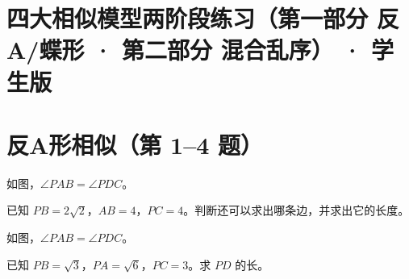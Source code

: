 \documentclass{exam-zh}
\begin{document}
\section*{四大相似模型两阶段练习（第一部分 反A/蝶形 · 第二部分 混合乱序） · 学生版}

\section*{反A形相似（第 1–4 题）}


\begin{problem}[points=10]
  \noindent
  \begin{minipage}[t]{\dimexpr\linewidth-60mm-6mm\relax}
    \vspace{0pt}
    如图，$\angle PAB=\angle PDC$。

已知 $PB=2\sqrt{2}$，$AB=4$，$PC=4$。判断还可以求出哪条边，并求出它的长度。
    
  \end{minipage}\hfill
  \begin{diagramcoltikz}{60mm}{}
  }
  \end{diagramcoltikz}
  \par\medskip
  \answerarea[54mm]
\end{problem}



\begin{problem}[points=10]
  \noindent
  \begin{minipage}[t]{\dimexpr\linewidth-60mm-6mm\relax}
    \vspace{0pt}
    如图，$\angle PAB=\angle PDC$。

已知 $PB=\sqrt{3}$，$PA=\sqrt{6}$，$PC=3$。求 $PD$ 的长。
    
  \end{minipage}\hfill
  \begin{diagramcoltikz}{60mm}{}
  }
  \end{diagramcoltikz}
  \par\medskip
  \answerarea[54mm]
\end{problem}


\end{document}
